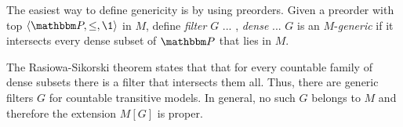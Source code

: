
The easiest way to define genericity is by using preorders.
Given a preorder with top $\lb\PP,\leq,\1\rb$ in $M$, define
\emph{filter} $G$ ... , \emph{dense} ...  $G$ is an $M$-\emph{generic}
if it intersects every dense subset of $\PP$ that lies in $M$.

The  Rasiowa-Sikorski theorem  states that that for every countable 
family of dense subsets there is a filter that intersects them
all. Thus, there are generic filters $G$ for countable transitive models.  In
general, no such  $G$ belongs to $M$ and therefore the extension
$M[G]$ is proper. 



